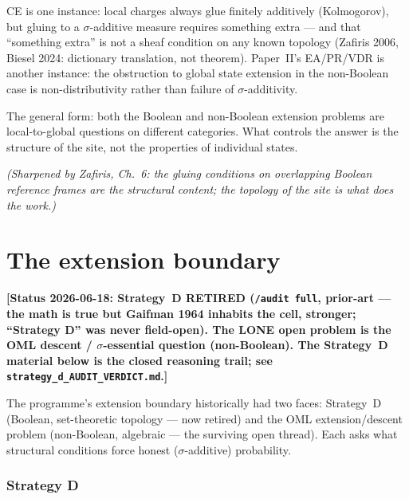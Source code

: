 \begin{enumerate}
    \smallskip\noindent
    CE is one instance: local charges always glue finitely
    additively (Kolmogorov), but gluing to a $\sigma$-additive
    measure requires something extra --- and that ``something
    extra'' is not a sheaf condition on any known topology
    (Zafiris 2006, Biesel 2024: dictionary translation, not
    theorem).  Paper~II's EA/PR/VDR is another instance: the
    obstruction to global state extension in the non-Boolean case
    is non-distributivity rather than failure of $\sigma$-additivity.

    \smallskip\noindent
    The general form: both the Boolean and non-Boolean extension
    problems are local-to-global questions on different categories.
    What controls the answer is the structure of the site, not the
    properties of individual states.

    \smallskip\noindent
    \emph{(Sharpened by Zafiris, Ch.~6: the gluing conditions
    on overlapping Boolean reference frames are the structural
    content; the topology of the site is what does the work.)}
\end{enumerate}


\part{The extension boundary}

\noindent\textbf{[Status 2026-06-18: Strategy~D RETIRED (\texttt{/audit full},
prior-art --- the math is true but Gaifman 1964 inhabits the cell, stronger;
``Strategy D'' was never field-open). The LONE open problem is the OML descent /
$\sigma$-essential question (non-Boolean). The Strategy~D material below is the
closed reasoning trail; see \texttt{strategy\_d\_AUDIT\_VERDICT.md}.]}

\medskip
The programme's extension boundary historically had two faces: Strategy~D
(Boolean, set-theoretic topology --- now retired) and the OML extension/descent
problem (non-Boolean, algebraic --- the surviving open thread).  Each asks what
structural conditions force honest ($\sigma$-additive) probability.

\section{Strategy D}

